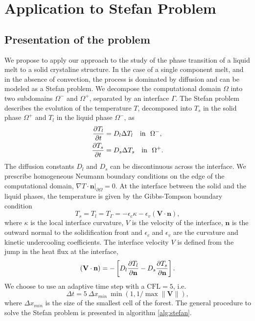 \section{Application to Stefan Problem} \label{sec:application}

\subsection{Presentation of the problem}

We propose to apply  our approach to the study of the phase transition of a liquid melt to a solid crystaline structure. In the case of a single component melt, and in the absence of convection, the process is dominated by diffusion and can be modeled as a Stefan problem. We decompose the computational domain $\Omega$ into  two subdomains $\Omega^-$ and $\Omega^+$, separated by an interface $\Gamma$. The Stefan problem describes the evolution of the temperature $T$, decomposed into $T_s$ in the solid phase $\Omega^+$ and $T_l$ in the liquid phase $\Omega^-$, as
\begin{align}
\frac{\partial T_l}{\partial t} & = D_l \Delta T_l \quad \mathrm{in} ~~ \Omega^-, \label{eq:stefan_heat_equation_l} \\
\frac{\partial T_s}{\partial t} & = D_s \Delta T_s \quad \mathrm{in} ~~ \Omega^+. \label{eq:stefan_heat_equation_s}
\end{align}
The diffusion constants $D_l$ and $D_s$ can be discontinuous across the interface. We prescribe homogeneous Neumann boundary conditions on the edge of the computational domain, $\nabla T \cdot \mathbf{n}\vert_{\partial \Omega}=0$. At the interface between the solid and the liquid phases, the temperature is given by the Gibbs-Tompson boundary condition \cite{Alexiades;Solomon;Wilson:88:The-formation-of-a-s, Alexiades;Solomon:93:Mathematical-Modelin}
\begin{equation} \label{eq:stefan_gibbs_tompson}
T_s = T_l = T_{\Gamma} = -\epsilon_c \kappa - \epsilon_v (\mathbf{V} \cdot \mathbf{n}),
\end{equation}
where $\kappa$ is the local interface curvature, $V$ is the velocity of the interface, $\mathbf{n}$ is the outward normal to the solidification front and $\epsilon_c$ and $\epsilon_v$ are the curvature and kinetic undercooling coefficients. The interface velocity $V$ is defined from the jump in the heat flux at the interface,
\begin{equation} \label{eq:stefan_velocity}
(\mathbf{V} \cdot \mathbf{n}) = - \left[ D_l \frac{\partial T_l}{\partial \mathbf{n}} - D_s \frac{\partial T_s}{\partial \mathbf{n}} \right].
\end{equation}
We choose to use an adaptive time step with a $\text{CFL} = 5$, i.e.
\begin{equation} \label{eq:stefan_dt}
\Delta t = 5 ~ \Delta x_{min} ~ \min(1,1/\max \lVert \mathbf{V} \rVert),
\end{equation}
where $\Delta x_{min}$ is the size of the smallest cell of the forest. The general procedure to solve the Stefan problem is presented in algorithm \ref{alg:stefan}.


